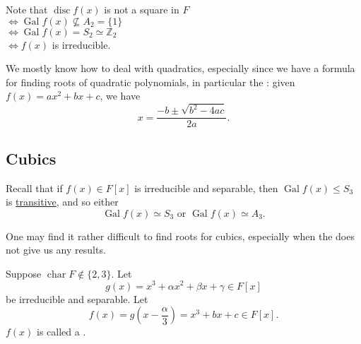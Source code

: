 \documentclass[notoc,notitlepage,nobib]{tufte-book}
\DeclareMathOperator{\disc}{disc}
\DeclareMathOperator{\Gal}{Gal}
\DeclareMathOperator{\Char}{char}
\begin{document}
Note that $\disc f(x)$ is not a square in $F$ \\
$\iff \Gal f(x) \not\subseteq A_2 = \{1\}$ \\
$\iff \Gal f(x) = S_2 \simeq \mathbb{Z}_2$ \\
$\iff f(x)$ is irreducible.

We mostly know how to deal with quadratics, especially since we have a formula
for finding roots of quadratic polynomials, in particular the : given $f(x) = ax^2 + bx + c$, we have
\begin{equation*}
  x = \frac{-b \pm \sqrt{b^2 - 4ac}}{2a}.
\end{equation*}


\subsection{Cubics}%
\label{sub:cubics}

Recall that if $f(x) \in F[x]$ is irreducible and separable, then $\Gal f(x)
\leq S_3$ is
\hyperref[crly:the_galois_group_of_a_separable_irreducible_polynomial_is_transitive]{transitive},
and so either
\begin{equation*}
  \Gal f(x) \simeq S_3 \text{ or } \Gal f(x) \simeq A_3.
\end{equation*}

One may find it rather difficult to find roots for cubics, especially when the
 does not give us any results.

\begin{defn}\label{defn:depressed_cubic}
  Suppose $\Char F \notin \{2, 3\}$. Let
  \begin{equation*}
    g(x) = x^3 + \alpha x^2 + \beta x + \gamma \in F[x]
  \end{equation*}
  be irreducible and separable. Let
  \begin{equation*}
    f(x) = g \left( x - \frac{\alpha}{3} \right) = x^3 + bx + c \in F[x].
  \end{equation*}
  $f(x)$ is called a .
\end{defn}
\end{document}

